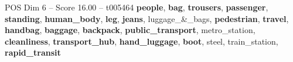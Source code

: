 \begin{textsample}{POS Dim 6 – Score 16.00 – t005464}  \label{ex:f6_pos_022}
\textbf{people}, \textbf{bag}, \textbf{trousers}, \textbf{passenger}, \textbf{standing}, \textbf{human\_body}, \textbf{leg}, \textbf{jeans}, luggage\_\&\_bags, \textbf{pedestrian}, \textbf{travel}, \textbf{handbag}, \textbf{baggage}, \textbf{backpack}, \textbf{public\_transport}, metro\_station, \textbf{cleanliness}, \textbf{transport\_hub}, \textbf{hand\_luggage}, \textbf{boot}, steel, train\_station, \textbf{rapid\_transit}

\end{textsample}
